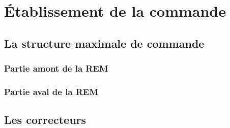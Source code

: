 
\section{Établissement de la commande}

\subsection{La structure maximale de commande}

\subsubsection{Partie amont de la REM}

\subsubsection{Partie aval de la REM}

\subsection{Les correcteurs}


